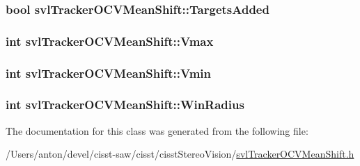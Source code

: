\subsubsection[{Targets\+Added}]{\setlength{\rightskip}{0pt plus 5cm}bool svl\+Tracker\+O\+C\+V\+Mean\+Shift\+::\+Targets\+Added\hspace{0.3cm}{\ttfamily [protected]}}\label{classsvl_tracker_o_c_v_mean_shift_a2054ed2ac9e61dc68e1c8d5733452e38}
\hypertarget{classsvl_tracker_o_c_v_mean_shift_aa30ea527e09f1642723f72b8052c4128}{}
\subsubsection[{Vmax}]{\setlength{\rightskip}{0pt plus 5cm}int svl\+Tracker\+O\+C\+V\+Mean\+Shift\+::\+Vmax\hspace{0.3cm}{\ttfamily [protected]}}\label{classsvl_tracker_o_c_v_mean_shift_aa30ea527e09f1642723f72b8052c4128}
\hypertarget{classsvl_tracker_o_c_v_mean_shift_a819979074decd36baa5f75e0db95764b}{}
\subsubsection[{Vmin}]{\setlength{\rightskip}{0pt plus 5cm}int svl\+Tracker\+O\+C\+V\+Mean\+Shift\+::\+Vmin\hspace{0.3cm}{\ttfamily [protected]}}\label{classsvl_tracker_o_c_v_mean_shift_a819979074decd36baa5f75e0db95764b}
\hypertarget{classsvl_tracker_o_c_v_mean_shift_a33e7390d7ed52a9a2f784ac7bf6a7c56}{}
\subsubsection[{Win\+Radius}]{\setlength{\rightskip}{0pt plus 5cm}int svl\+Tracker\+O\+C\+V\+Mean\+Shift\+::\+Win\+Radius\hspace{0.3cm}{\ttfamily [protected]}}\label{classsvl_tracker_o_c_v_mean_shift_a33e7390d7ed52a9a2f784ac7bf6a7c56}


The documentation for this class was generated from the following file\+:\begin{DoxyCompactItemize}
\item 
/\+Users/anton/devel/cisst-\/saw/cisst/cisst\+Stereo\+Vision/\hyperlink{svl_tracker_o_c_v_mean_shift_8h}{svl\+Tracker\+O\+C\+V\+Mean\+Shift.\+h}\end{DoxyCompactItemize}
